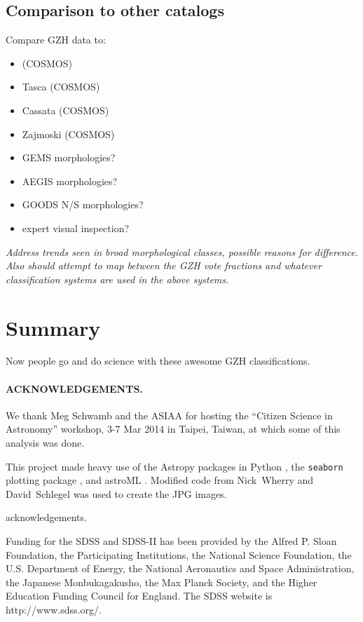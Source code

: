 \documentclass[usenatbib]{mn2e}
\begin{document}
\subsection{Comparison to other catalogs}

Compare GZH data to:

\begin{itemize}
    \item \citet[ZEST;][]{sca07} (COSMOS)
    \item Tasca (COSMOS)
    \item Cassata (COSMOS)
    \item Zajmoski (COSMOS)
    \item GEMS morphologies?
    \item AEGIS morphologies?
    \item GOODS N/S morphologies?
    \item expert visual inspection?
\end{itemize}

\textit{Address trends seen in broad morphological classes, possible reasons for difference. Also should attempt to map between the GZH vote fractions and whatever classification systems are used in the above systems.}

\section{Summary}\label{sec:summary}

Now people go and do science with these awesome GZH classifications.  
 
\paragraph*{ACKNOWLEDGEMENTS.} 

We thank Meg Schwamb and the ASIAA for hosting the ``Citizen Science in Astronomy'' workshop, 3-7 Mar 2014 in Taipei, Taiwan, at which some of this analysis was done. 

This project made heavy use of the Astropy packages in Python \citep{ast13}, the \texttt{seaborn} plotting package \citep{was15}, and astroML \citep{van12}. Modified code from Nick~Wherry and David~Schlegel was used to create the JPG images. 

\hubble{} acknowledgements.

Funding for the SDSS and SDSS-II has been provided by the Alfred P. Sloan Foundation, the Participating Institutions, the National Science Foundation, the U.S. Department of Energy, the National Aeronautics and Space Administration, the Japanese Monbukagakusho, the Max Planck Society, and the Higher Education Funding Council for England. The SDSS website is http://www.sdss.org/. 
\end{document}
